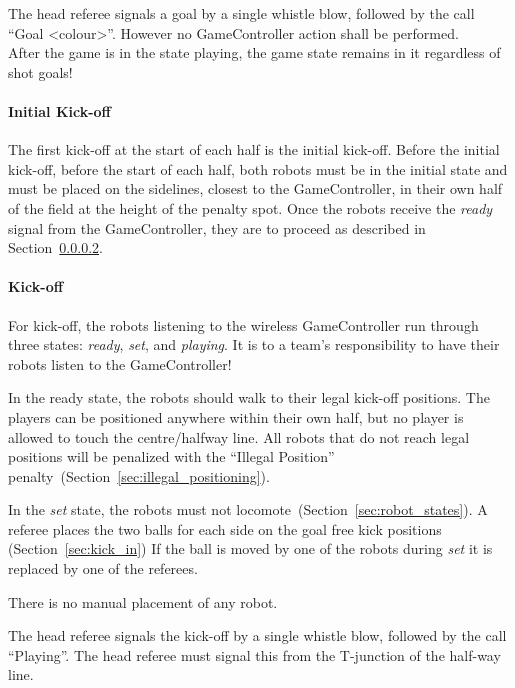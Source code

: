 The head referee signals a goal by a single whistle blow, followed by the call ``Goal \textless colour\textgreater''. However no GameController action shall be performed. \\
After the game is in the state playing, the game state remains in it regardless of shot goals!


\paragraph{Initial Kick-off}
\label{sec:initial-kick-off}

The first kick-off at the start of each half is the initial kick-off.
Before the initial kick-off, \ie before the start of each half, both robots must be in the initial state and must be placed on the sidelines, closest to the GameController, in their own half of the field at the height of the penalty spot. 
Once the robots receive the \emph{ready} signal from the GameController, they are to proceed as described in Section~\ref{sec:kick-off}.

\paragraph{Kick-off}
\label{sec:kick-off}
For kick-off, the robots listening to the wireless GameController run through three states: \emph{ready}, \emph{set}, and \emph{playing}. It is to a team's responsibility to have their robots listen to the GameController!

In the ready state, the robots should walk to their legal kick-off positions.
The players can be positioned anywhere within their own half, but no player is allowed to touch the centre/halfway line. All robots that do not reach legal positions will be penalized with the ``Illegal Position'' penalty~(\cf Section~\ref{sec:illegal_positioning}).

In the \emph{set} state, the robots must not locomote~(\cf Section~\ref{sec:robot_states}). A referee places the two balls for each side on the goal free kick positions (\cf Section~\ref{sec:kick_in})
If the ball is moved by one of the robots during \emph{set} it is replaced by one of the referees.

There is no manual placement of any robot.

The head referee signals the kick-off by a single whistle blow, followed by the call ``Playing''. The head referee must signal this from the T-junction of the half-way line.

